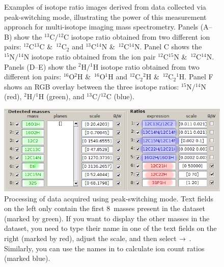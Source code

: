 \begin{figure}[!ht]
\begin{tabular}{ccc}
\end{tabular}
\caption{\label{fig:LANS-8plus-ratios}%
Examples of isotope ratio images derived from data collected via peak-switching mode, illustrating the power of this measurement approach for multi-isotope imaging mass spectrometry. Panels (A--B) show the ${}^{13}\mathrm{C}/{}^{12}\mathrm{C}$ isotope ratio obtained from two different ion pairs: ${}^{12}\mathrm{C}{}^{13}\mathrm{C}$ \&\ ${}^{12}\mathrm{C}_2$ and ${}^{13}\mathrm{C}{}^{14}\mathrm{N}$ \&\ ${}^{12}\mathrm{C}{}^{14}\mathrm{N}$. Panel C shows the ${}^{15}\mathrm{N}/{}^{14}\mathrm{N}$ isotope ratio obtained from the ion pair ${}^{12}\mathrm{C}{}^{15}\mathrm{N}$ \&\ ${}^{12}\mathrm{C}{}^{14}\mathrm{N}$. Panels (D--E) show the ${}^{2}\mathrm{H}/{}^{1}\mathrm{H}$ isotope ratio obtained from two different ion pairs: ${}^{16}\mathrm{O}{}^{2}\mathrm{H}$ \&\ ${}^{16}\mathrm{O}{}^{1}\mathrm{H}$ and ${}^{12}\mathrm{C}_2{}^{2}\mathrm{H}$ \&\ ${}^{12}\mathrm{C}_2{}^{1}\mathrm{H}$. Panel F shows an RGB overlay between the three isotope ratios: ${}^{15}\mathrm{N}/{}^{14}\mathrm{N}$ (red), ${}^{2}\mathrm{H}/{}^{1}\mathrm{H}$ (green), and ${}^{13}\mathrm{C}/{}^{12}\mathrm{C}$ (blue).}
\end{figure}

\begin{figure}[!ht]
\centering
\includegraphics[scale=0.45, valign=t]{figs8/LANS-8plus-masses-ratios}
\caption{\label{fig:LANS-8plus-extra-masses}%
Processing of data acquired using peak-switching mode. Text fields on the left only contain the first 8~masses present in the dataset (marked by green). If you want to display the other masses in the dataset, you need to type their name in one of the  text fields on the right (marked by red), adjust the scale, and then select  $\rightarrow$ . Similarly, you can use the names in  to calculate ion count ratios (marked blue).}
\end{figure}

